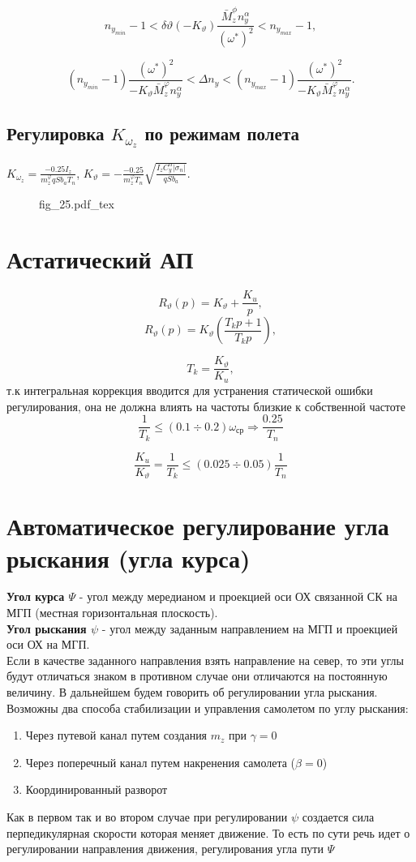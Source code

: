 \documentclass{article}
\begin{document}
\[
	n_{{y}_{min}} - 1<  \delta \vartheta (- K_\vartheta)\frac{\bar{M}_z^\phi n_y^\alpha}{(\omega^*)^2} < n_{{y}_{max}} - 1,
\]

\[
	(n_{{y}_{min}} - 1)\frac{(\omega^*)^2}{-K_{\vartheta}\bar{M}_z^\varphi n_y^\alpha}< \Delta n_y< (n_{{y}_{max}} - 1) \frac{(\omega^*)^2}{-K_{\vartheta}\bar{M}_z^\varphi n_y^\alpha}.
\]

\subsection{Регулировка $K_{\omega_z}$ по режимам полета}
$K_{\omega_z}  =\frac{-0.25 I_z}{m_z^\varphi q S b_a T_n}$, $K_{\vartheta}  = - \frac{-0.25}{m_z^\varphi T_n} \sqrt{\frac{I_z C_y^\alpha |\sigma_n|}{qSb_a}}$.
\begin{figure}[H]
	\centering
	{fig_25.pdf_tex}
\end{figure}

\section{Астатический АП}
\[
	R_{\vartheta}(p) = K_\vartheta + \frac{K_u}{p},
\]
\[
	R_{\vartheta}(p) = K_\vartheta(\frac{T_k p  + 1 }{T_k p}),
\]

\[
	T_k = \frac{K_\vartheta}{K_u},
\]
т.к интегральная коррекция вводится для устранения статической ошибки регулирования, она не должна влиять на частоты близкие к собственной частоте 
\[
	\frac{1}{T_k} \leq (0.1 \div 0.2) \omega_\text{ср} \Rightarrow \frac{0.25}{T_n}
\]

\[
	\frac{K_u}{K_\vartheta} =  \frac{1}{T_k} \leq (0.025 \div 0.05) \frac{1}{T_n}
\]
\section{Автоматическое регулирование угла рыскания (угла курса)}
\textbf{Угол курса $\Psi$} - угол между мередианом и проекцией оси ОХ связанной СК на МГП (местная горизонтальная плоскость).\\
\textbf{Угол рыскания $\psi$} - угол между заданным направлением на МГП и проекцией оси ОХ на МГП.\\
Если в качестве заданного направления взять направление на север, то эти углы будут отличаться знаком в противном случае они отличаются на постоянную величину. В дальнейшем будем говорить об регулировании угла рыскания. Возможны два способа стабилизации и управления самолетом по углу рыскания:
\begin{enumerate}
	\item Через путевой канал путем создания $m_z$ при $\gamma = 0$
	\item Через поперечный канал путем накренения самолета ($\beta = 0$)
	\item Координированный разворот
\end{enumerate}
Как в первом так и во втором случае при регулировании $\psi$ создается сила перпедикулярная скорости которая меняет движение. То есть по сути речь идет о регулировании направления движения, регулирования угла пути $\Psi$
\end{document}
